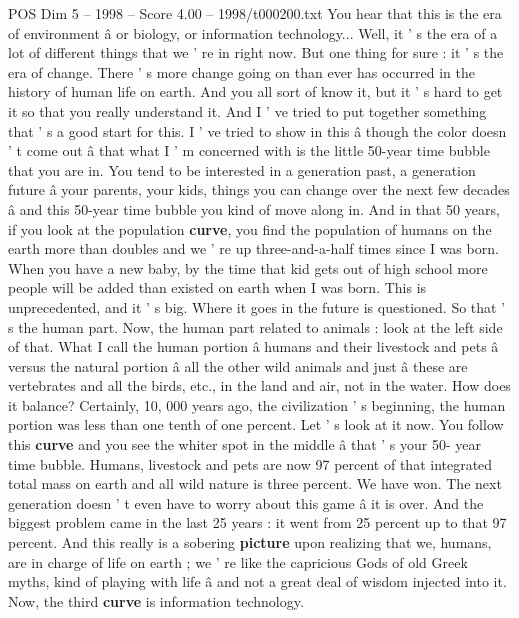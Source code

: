 \begin{textsample}{POS Dim 5 – 1998 – Score 4.00 – 1998/t000200.txt}  \label{ex:f5_pos_012}
You hear that this is the era of environment â or biology, or information technology...
Well, it ' s the era of a lot of different things that we ' re in right now.
But one thing for sure : it ' s the era of change.
There ' s more change going on than ever has occurred in the history of human life on earth.
And you all sort of know it, but it ' s hard to get it so that you really understand it.
And I ' ve tried to put together something that ' s a good start for this.
I ' ve tried to show in this â though the color doesn ' t come out â that what I ' m concerned with is the little 50-year time bubble that you are in.
You tend to be interested in a generation past, a generation future â your parents, your kids, things you can change over the next few decades â and this 50-year time bubble you kind of move along in.
And in that 50 years, if you look at the population \textbf{curve}, you find the population of humans on the earth more than doubles and we ' re up three-and-a-half times since I was born.
When you have a new baby, by the time that kid gets out of high school more people will be added than existed on earth when I was born.
This is unprecedented, and it ' s big.
Where it goes in the future is questioned.
So that ' s the human part.
Now, the human part related to animals : look at the left side of that.
What I call the human portion â humans and their livestock and pets â versus the natural portion â all the other wild animals and just â these are vertebrates and all the birds, etc., in the land and air, not in the water.
How does it balance?
Certainly, 10, 000 years ago, the civilization ' s beginning, the human portion was less than one tenth of one percent.
Let ' s look at it now.
You follow this \textbf{curve} and you see the whiter spot in the middle â that ' s your 50- year time bubble.
Humans, livestock and pets are now 97 percent of that integrated total mass on earth and all wild nature is three percent.
We have won.
The next generation doesn ' t even have to worry about this game â it is over.
And the biggest problem came in the last 25 years : it went from 25 percent up to that 97 percent.
And this really is a sobering \textbf{picture} upon realizing that we, humans, are in charge of life on earth ; we ' re like the capricious Gods of old Greek myths, kind of playing with life â and not a great deal of wisdom injected into it.
Now, the third \textbf{curve} is information technology.

\end{textsample}
